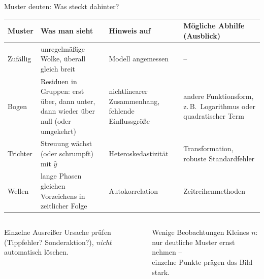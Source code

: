 \documentclass[aspectratio=169,11pt]{beamer}
\begin{document}
\begin{frame}{Muster deuten: Was steckt dahinter?}
  \footnotesize
  \begin{center}
    \renewcommand{\arraystretch}{1.12}
    \begin{tabular}{@{}L{1.7cm} L{4.1cm} L{3.6cm} L{4.1cm}@{}}
      \toprule
      \textbf{Muster} & \textbf{Was man sieht} & \textbf{Hinweis auf} & \textbf{Mögliche Abhilfe (Ausblick)} \\
      \midrule
      Zufällig & unregelmäßige Wolke, überall gleich breit
        & Modell angemessen & -- \\ \addlinespace[3pt]
      Bogen & Residuen in Gruppen: erst über, dann unter, dann wieder über null (oder umgekehrt)
        & nichtlinearer Zusammenhang, fehlende Einflussgröße
        & andere Funktionsform, z.\,B.\ Logarithmus oder quadratischer Term \\ \addlinespace[3pt]
      Trichter & Streuung wächst (oder schrumpft) mit $\hat{y}$
        & Heteroskedastizität & Transformation, robuste Standardfehler \\ \addlinespace[3pt]
      Wellen & lange Phasen gleichen Vorzeichens in zeitlicher Folge
        & Autokorrelation & Zeitreihenmethoden \\
      \bottomrule
    \end{tabular}
  \end{center}

  \begin{columns}[T]
    \begin{column}{0.49\textwidth}
      \begin{alertblock}{Einzelne Ausreißer}
        Ursache prüfen (Tippfehler? Sonderaktion?), \emph{nicht} automatisch löschen.
      \end{alertblock}
    \end{column}
    \begin{column}{0.49\textwidth}
      \begin{exampleblock}{Wenige Beobachtungen}
        Kleines $n$: nur deutliche Muster ernst nehmen --\\ einzelne Punkte prägen das Bild stark.
      \end{exampleblock}
    \end{column}
  \end{columns}
\end{frame}
\end{document}
